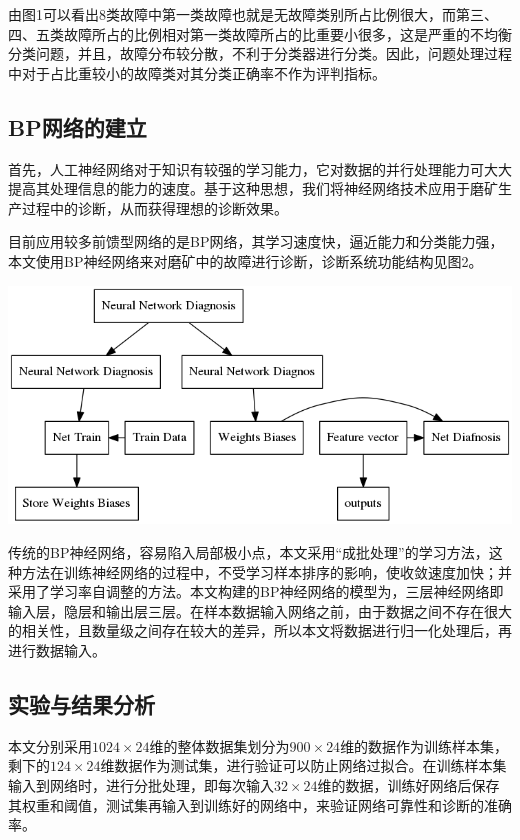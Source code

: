 \documentclass{ctacn}%
\begin{document}
\begin{multicols}{2}
由图1可以看出8类故障中第一类故障也就是无故障类别所占比例很大，而第三、四、五类故障所占的比例相对第一类故障所占的比重要小很多，这是严重的不均衡分类问题，并且，故障分布较分散，不利于分类器进行分类。因此，问题处理过程中对于占比重较小的故障类对其分类正确率不作为评判指标。

\subsection{BP网络的建立}

首先，人工神经网络对于知识有较强的学习能力，它对数据的并行处理能力可大大提高其处理信息的能力的速度。基于这种思想，我们将神经网络技术应用于磨矿生产过程中的诊断，从而获得理想的诊断效果。

目前应用较多前馈型网络的是BP网络，其学习速度快，逼近能力和分类能力强，本文使用BP神经网络来对磨矿中的故障进行诊断，诊断系统功能结构见图2。

\begin{center}
	\includegraphics[scale=0.12, trim=0 0 0 0]{figs/procedure}
	\label{fig2}
\end{center}

传统的BP神经网络，容易陷入局部极小点，本文采用“成批处理”的学习方法，这种方法在训练神经网络的过程中，不受学习样本排序的影响，使收敛速度加快；并采用了学习率自调整的方法。本文构建的BP神经网络的模型为，三层神经网络即输入层，隐层和输出层三层。在样本数据输入网络之前，由于数据之间不存在很大的相关性，且数量级之间存在较大的差异，所以本文将数据进行归一化处理后，再进行数据输入。

\subsection{实验与结果分析}

本文分别采用$1024\times24$维的整体数据集划分为$900\times24$维的数据作为训练样本集，剩下的$124\times24$维数据作为测试集，进行验证可以防止网络过拟合。在训练样本集输入到网络时，进行分批处理，即每次输入$32\times24$维的数据，训练好网络后保存其权重和阈值，测试集再输入到训练好的网络中，来验证网络可靠性和诊断的准确率。


\end{multicols}
\end{document}
